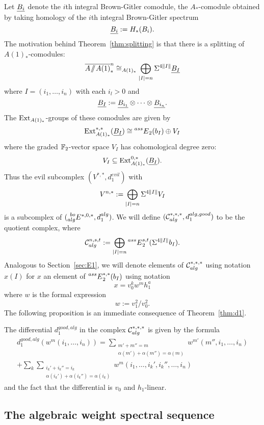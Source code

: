 Let $\underline{B_i}$ denote the $i$th integral Brown-Gitler comodule, the $A_*$-comodule obtained by taking homology of the $i$th integral Brown-Gitler spectrum
$$ \underline{B_i} := H_*(B_i). $$
The motivation behind Theorem~\ref{thm:splitting} is that there is a splitting of $A(1)_*$-comodules:
\begin{equation}\label{eq:algsplitting}
 \overline{A \! \sslash \! A(1)}^n_* \cong_{A(1)_*} \bigoplus_{\lvert I \rvert = n} \Sigma^{4\lVert I \rVert} \underline{B_I}
 \end{equation}
where $I = (i_1, \ldots, i_n)$ with each $i_l > 0$ and 
$$ \underline{B_I} := \underline{B_{i_1}} \otimes \cdots \otimes \underline{B_{i_n}}. $$
The $\operatorname{Ext}_{A(1)_*}$-groups of these comodules are given by
$$ \operatorname{Ext}^{*,*}_{A(1)_*}(\underline{B_I}) \cong \prescript{ass}{}{E}_2(b_I) \oplus V_I $$
where the graded $\mathbb{F}_2$-vector space $V_I$ has cohomological degree zero:
$$ V_I \subseteq \operatorname{Ext}^{0,*}_{A(1)_*}(\underline{B_I}). $$
Thus the evil subcomplex $(V^{*,*}, d_1^{evil})$ with
$$
V^{n,*} := \bigoplus_{\lvert I \rvert = n} \Sigma^{4\lVert I \rVert} V_I
$$
is a subcomplex of $(\prescript{bo}{alg}{E}^{*,0,*}, d_1^{alg})$.
We will define $(\mathcal{C}^{*,*,*}_{alg}, d_1^{alg,good})$ to be the quotient complex, where
\begin{equation}\label{eq:Calg}
\mathcal{C}^{n,s,t}_{alg} := \bigoplus_{\lvert I \rvert = n} \prescript{ass}{}{E}^{s,t}_2(\Sigma^{4\lVert I \rVert} b_I).
\end{equation}
Analogous to Section~\ref{sec:E1}, we will denote elements of $\mathcal{C}_{alg}^{*,*,*}$
using notation
$ x(I)$
for $x$ an element of $\prescript{ass}{}{E}_2^{*,*}(b_I)$
using notation
$$ x = v_0^k w^m h_1^a $$
where $w$ is the formal expression 
$$ w := v_1^2/v_0^2. $$
The following proposition is an immediate consequence of Theorem~\ref{thm:d1}.

\begin{prop}\label{prop:d1alg}
	The differential $d_1^{good, alg}$ in the complex $\mathcal{C}_{alg}^{*,*,*}$ is given by the formula
	\begin{multline*}
	 d_1^{good,alg}(w^m(i_1, \ldots, i_n)) = \sum_{\substack{m' + m'' = m \\
	 \alpha(m')+\alpha(m'') = \alpha(m)}} w^{m'}(m'', i_1, \ldots, i_n) \\ + 
	\sum_k \sum_{\substack{i_k'+i_k'' = i_k \\ \alpha(i_k') + \alpha(i_k'') = \alpha(i_k)}} w^m(i_1, \ldots, i_k', i_k'', \ldots, i_n) \end{multline*}
	and the fact that the differential is $v_0$ and $h_1$-linear.
\end{prop}

\subsection*{The algebraic weight spectral sequence}

